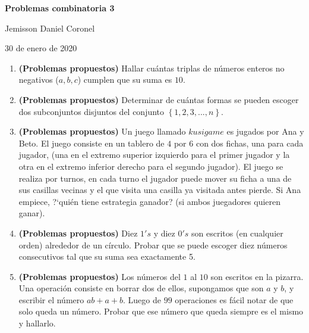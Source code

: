 \documentclass[10pt,a4 paper]{article}
\begin{document}
\chead{}

\begin{center}
\textbf{\Large{Problemas combinatoria 3}}
\end{center}

\begin{center}
Jemisson Daniel Coronel
\end{center}

\begin{center}
30 de enero de 2020
\end{center}
\vspace{9mm}
\begin{enumerate}

\item \textbf{(Problemas propuestos)} Hallar cu\'antas triplas de n\'umeros enteros no negativos ($a, b, c$) cumplen que su suma es $10$.   

\item \textbf{(Problemas propuestos)} Determinar de cu\'antas formas se pueden escoger dos subconjuntos disjuntos del conjunto $\left \{ 1, 2, 3,..., n \right \}$. 

\item \textbf{(Problemas propuestos)} Un juego llamado $kusigame$ es jugados por Ana y Beto. El juego consiste en un tablero de $4$ por $6$ con dos fichas, una para cada jugador, (una en el extremo superior izquierdo para el primer jugador y la otra en el extremo inferior derecho para el segundo jugador). El juego se realiza por turnos, en cada turno el jugador puede mover su ficha a una de sus casillas vecinas y el que visita una casilla ya visitada antes pierde. Si Ana empiece, ?`qui\'en tiene estrategia ganador? (si ambos juegadores quieren ganar). 

\item \textbf{(Problemas propuestos)} Diez $1's$ y diez $0's$ son escritos (en cualquier orden) alrededor de un c\'irculo. Probar que se puede escoger diez n\'umeros consecutivos tal que su suma sea exactamente 5. 

\item \textbf{(Problemas propuestos)} Los n\'umeros del $1$ al $10$ son escritos en la pizarra. Una operaci\'on consiste en borrar dos de ellos, supongamos que son $a$ y $b$, y escribir el n\'umero $ab + a + b$. Luego de $99$ operaciones es f\'acil notar de que solo queda un n\'umero. Probar que ese n\'umero que queda siempre es el mismo y hallarlo.


\end{enumerate}
\end{document}
